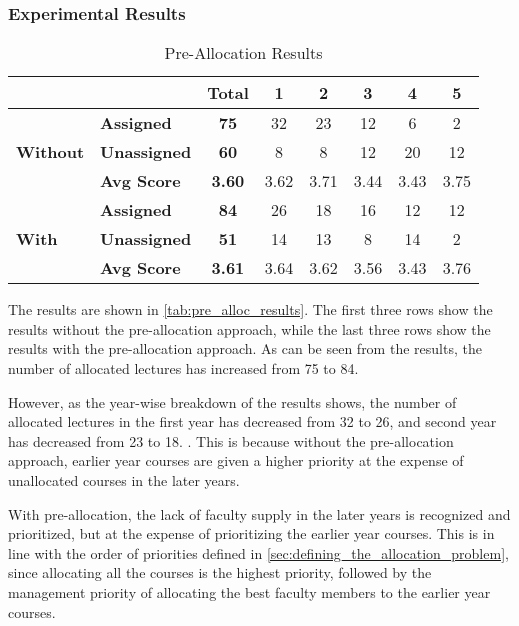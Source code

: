 \subsubsection{Experimental Results}

\begin{table}[H]
  \centering
  \begin{tabular}{|l|l|c|c|c|c|c|c|}
    \hline
                     &                     & \textbf{Total} & \textbf{1} & \textbf{2} & \textbf{3} & \textbf{4} & \textbf{5} \\ \hline
                     & \textbf{Assigned}   & \textbf{75}    & 32         & 23         & 12         & 6          & 2          \\
    \textbf{Without} & \textbf{Unassigned} & \textbf{60}    & 8          & 8          & 12         & 20         & 12         \\
                     & \textbf{Avg Score}  & \textbf{3.60}  & 3.62       & 3.71       & 3.44       & 3.43       & 3.75       \\\hline
                     & \textbf{Assigned}   & \textbf{84}    & 26         & 18         & 16         & 12         & 12         \\
    \textbf{With}    & \textbf{Unassigned} & \textbf{51}    & 14         & 13         & 8          & 14         & 2          \\
                     & \textbf{Avg Score}  & \textbf{3.61}  & 3.64       & 3.62       & 3.56       & 3.43       & 3.76       \\
    \hline
  \end{tabular}
  \caption{Pre-Allocation Results}
  \label{tab:pre_alloc_results}
\end{table}

The results are shown in \autoref{tab:pre_alloc_results}. The first three rows show the results without the pre-allocation approach, while the last three rows show the results with the pre-allocation approach. As can be seen from the results, the number of allocated lectures has increased from 75 to 84.

However, as the year-wise breakdown of the results shows, the number of allocated lectures in the first year has decreased from 32 to 26, and second year has decreased from 23 to 18. . This is because without the pre-allocation approach, earlier year courses are given a higher priority at the expense of unallocated courses in the later years.

With pre-allocation, the lack of faculty supply in the later years is recognized and prioritized, but at the expense of prioritizing the earlier year courses. This is in line with the order of priorities defined in \autoref{sec:defining_the_allocation_problem}, since allocating all the courses is the highest priority, followed by the management priority of allocating the best faculty members to the earlier year courses.


